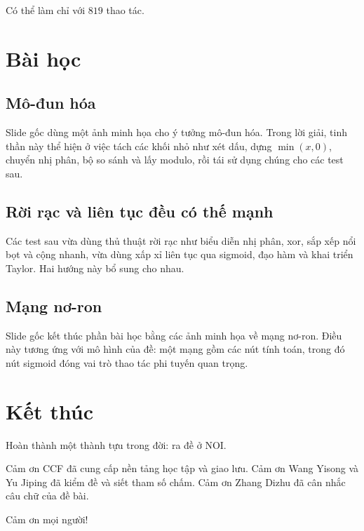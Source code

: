 \documentclass[11pt]{article}
\begin{document}
Có thể làm chỉ với $819$ thao tác.

\section{Bài học}

\subsection*{Mô-đun hóa}

Slide gốc dùng một ảnh minh họa cho ý tưởng mô-đun hóa. Trong lời giải, tinh
thần này thể hiện ở việc tách các khối nhỏ như xét dấu, dựng $\min(x,0)$,
chuyển nhị phân, bộ so sánh và lấy modulo, rồi tái sử dụng chúng cho các test
sau.

\subsection*{Rời rạc và liên tục đều có thế mạnh}

Các test sau vừa dùng thủ thuật rời rạc như biểu diễn nhị phân, xor, sắp xếp
nổi bọt và cộng nhanh, vừa dùng xấp xỉ liên tục qua sigmoid, đạo hàm và khai
triển Taylor. Hai hướng này bổ sung cho nhau.

\subsection*{Mạng nơ-ron}

Slide gốc kết thúc phần bài học bằng các ảnh minh họa về mạng nơ-ron. Điều
này tương ứng với mô hình của đề: một mạng gồm các nút tính toán, trong đó
nút sigmoid đóng vai trò thao tác phi tuyến quan trọng.

\section{Kết thúc}

Hoàn thành một thành tựu trong đời: ra đề ở NOI.

Cảm ơn CCF đã cung cấp nền tảng học tập và giao lưu. Cảm ơn Wang Yisong và Yu
Jiping đã kiểm đề và siết tham số chấm. Cảm ơn Zhang Dizhu đã cân nhắc câu
chữ của đề bài.

Cảm ơn mọi người!
\end{document}
